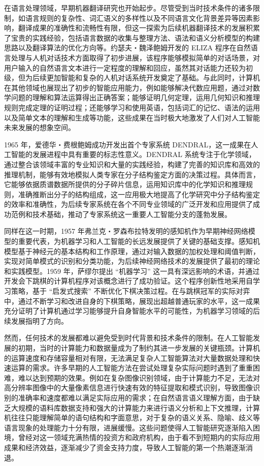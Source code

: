在语言处理领域，早期机器翻译研究也开始起步。尽管受到当时技术条件的诸多限制，如语言规则的复杂性、词汇语义的多样性以及不同语言文化背景差异等因素影响，翻译成果的准确性和流畅性有限，但这一探索为后续机器翻译技术的发展积累了宝贵的实践经验，包括语言数据的收集与整理方法、语法和语义分析模型的构建思路以及翻译算法的优化方向等。约瑟夫・魏泽鲍姆开发的 ELIZA 程序在自然语言处理与人机对话技术方面取得了初步进展，该程序能够模拟简单的对话场景，对用户输入的自然语言文本进行一定程度的理解和回应，虽然其对话能力还较为初级，但为后续更加智能和复杂的人机对话系统开发奠定了基础。与此同时，计算机在其他领域也展现出了初步的智能应用能力，例如能够解决代数应用题，通过对数学问题的理解和算法运算得出正确答案；能够证明几何定理，运用几何知识和推理规则完成定理的证明过程；还能够学习和使用英语，包括词汇的记忆、语法的运用以及简单文本的理解和生成等功能，这些成果在当时极大地激发了人们对人工智能未来发展的想象空间。


1965 年，爱德华・费根鲍姆成功开发出首个专家系统 DENDRAL，这一成果在人工智能的发展进程中具有重要的标志性意义。DENDRAL 系统专注于化学领域，通过整合该领域丰富的专业知识和大量的实践经验，构建了完善的知识库和高效的推理机制，能够有效地模拟人类专家在分子结构鉴定方面的决策过程。具体而言，它能够依据质谱数据所提供的分子碎片信息，运用知识库中的化学知识和推理规则，准确推断出分子的结构组成，这一应用极大地提高了化学研究中分子结构鉴定的效率和准确性，为后续专家系统在各个不同专业领域的广泛开发和应用提供了成功范例和技术基础，推动了专家系统这一重要人工智能分支的蓬勃发展。


同样在这一时期，1957 年弗兰克・罗森布拉特发明的感知机作为早期神经网络模型的重要代表，为机器学习和人工智能的长远发展提供了关键的基础支撑。感知机模型基于神经元的基本结构和工作原理，通过对输入数据的加权处理和阈值判断，实现对简单模式的识别和分类功能，为后续神经网络技术的发展提供了最初的理论和实践模型。1959 年，萨缪尔提出 “机器学习” 这一具有深远影响的术语，并通过开发会下跳棋的计算机程序对该概念进行了成功验证。这个程序创新性地采用自学习策略，基于 “启发式搜索” 不断优化下棋决策过程。在与跳棋冠军的实际对弈中，通过不断学习和改进自身的下棋策略，展现出超越普通玩家的水平，这一成果充分证明了计算机通过学习能够提升自身智能水平的可能性，为机器学习领域的后续发展指明了方向。


然而，任何技术的发展都难以避免受到时代背景和技术条件的限制。在人工智能发展的初期，当时的计算能力和数据量成为了制约其进一步发展的关键瓶颈。计算机的运算速度和存储容量相对有限，无法满足复杂人工智能算法对大量数据处理和快速运算的需求。许多早期的人工智能方法在尝试处理复杂实际问题时遇到了重重困难，难以达到预期的效果。例如在复杂图像识别领域，由于计算能力不足，无法对高分辨率图像中的大量像素信息进行快速有效的特征提取和模式识别，导致图像识别的准确率和速度都难以满足实际应用的需求；在自然语言语义理解方面，由于缺乏大规模的语料库数据支持和强大的计算能力来进行语义分析和上下文推理，计算机往往只能理解简单的语句结构和字面意思，对于复杂的语义关系、隐喻、歧义等语言现象的处理能力十分有限，进展缓慢。这些问题使得人工智能研究逐渐陷入困境，曾经对这一领域充满热情的投资方和政府机构，由于看不到短期内的实际应用成果和经济效益，逐渐减少了资金支持力度，导致人工智能的第一个热潮逐渐消退。


